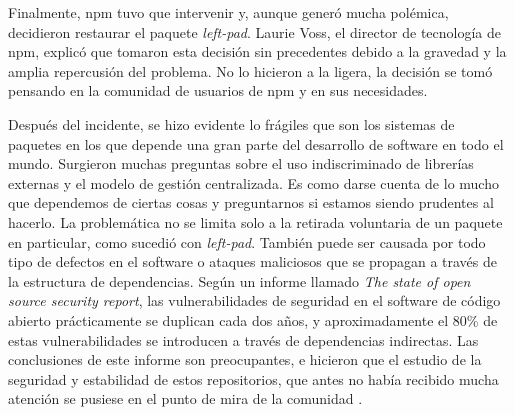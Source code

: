 Finalmente, npm tuvo que intervenir y, aunque generó mucha polémica, decidieron restaurar el paquete \textit{left-pad}. Laurie Voss, 
el director de tecnología de npm, explicó que tomaron esta decisión sin precedentes debido a la gravedad y la amplia repercusión del 
problema. No lo hicieron a la ligera, la decisión se tomó pensando en la comunidad de usuarios de npm y en sus necesidades.


Después del incidente, se hizo evidente lo frágiles que son los sistemas de paquetes en los que depende una gran parte del desarrollo
de software en todo el mundo.
Surgieron muchas preguntas sobre el uso indiscriminado de librerías externas \cite{10.1145/3106237.3106267} y el modelo de gestión centralizada.
Es como darse cuenta de lo mucho que dependemos de ciertas cosas y preguntarnos si estamos siendo prudentes al hacerlo.
La problemática no se limita solo a la retirada voluntaria de un paquete en particular, como sucedió con \textit{left-pad}.
También puede ser causada por todo tipo de defectos en el software o ataques maliciosos que se propagan a través de la estructura de dependencias.
Según un informe llamado \textit{The state of open source security report}, las vulnerabilidades de seguridad en el software de código abierto
prácticamente se duplican cada dos años, y aproximadamente el 80\% de estas vulnerabilidades se introducen a través de dependencias indirectas.
Las conclusiones de este informe son preocupantes, e hicieron que el estudio de la seguridad y estabilidad de estos repositorios, que antes no había
recibido mucha atención se pusiese en el punto de mira de la comunidad \cite{10.5555/2820518.2820524} \cite{10.1145/3196398.3196401} \cite{BogartChristopherKastner2015}.


